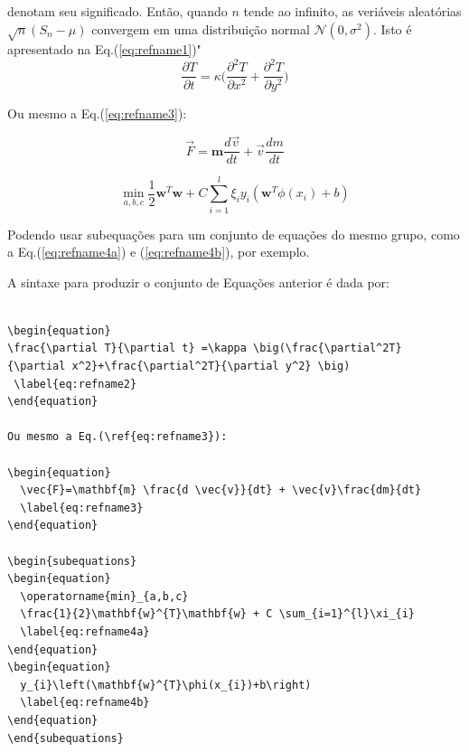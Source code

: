 \documentclass[12pt,A4,A4pt]{article}
\begin{document}
{denotam seu significado. Então, quando $n$ tende ao infinito, as veriáveis aleatórias $\sqrt{n}(S_n - \mu)$ convergem em uma distribuição normal $\mathcal{N}(0, \sigma^2)$. Isto é apresentado na Eq.(\ref{eq:refname1})"\\



\begin{equation}
 \frac{\partial T}{\partial t} =\kappa \big(\frac{\partial^2T}{\partial x^2}+\frac{\partial^2T}{\partial y^2} \big) 
 \label{eq:refname2}
\end{equation}

Ou mesmo a Eq.(\ref{eq:refname3}):

\begin{equation}
  \vec{F}=\mathbf{m} \frac{d \vec{v}}{dt} + \vec{v}\frac{dm}{dt} 
  \label{eq:refname3}
\end{equation}

\begin{subequations}
\begin{equation}
  \operatorname{min}_{a,b,c} 
  \frac{1}{2}\mathbf{w}^{T}\mathbf{w} + C \sum_{i=1}^{l}\xi_{i}
  \label{eq:refname4a}
\end{equation}    
\begin{equation}
  y_{i}\left(\mathbf{w}^{T}\phi(x_{i})+b\right)
  \label{eq:refname4b}
\end{equation}
\end{subequations}

Podendo usar subequações para um conjunto de equações do mesmo grupo, como a Eq.(\ref{eq:refname4a}) e (\ref{eq:refname4b}), por exemplo.

A sintaxe para produzir o conjunto de Equações anterior é dada por:

\begin{verbatim}

\begin{equation}
\frac{\partial T}{\partial t} =\kappa \big(\frac{\partial^2T}
{\partial x^2}+\frac{\partial^2T}{\partial y^2} \big) 
 \label{eq:refname2}
\end{equation}

Ou mesmo a Eq.(\ref{eq:refname3}):

\begin{equation}
  \vec{F}=\mathbf{m} \frac{d \vec{v}}{dt} + \vec{v}\frac{dm}{dt} 
  \label{eq:refname3}
\end{equation}

\begin{subequations}
\begin{equation}
  \operatorname{min}_{a,b,c} 
  \frac{1}{2}\mathbf{w}^{T}\mathbf{w} + C \sum_{i=1}^{l}\xi_{i}
  \label{eq:refname4a}
\end{equation}    
\begin{equation}
  y_{i}\left(\mathbf{w}^{T}\phi(x_{i})+b\right)
  \label{eq:refname4b}
\end{equation}
\end{subequations}


\end{verbatim}}
\end{document}
